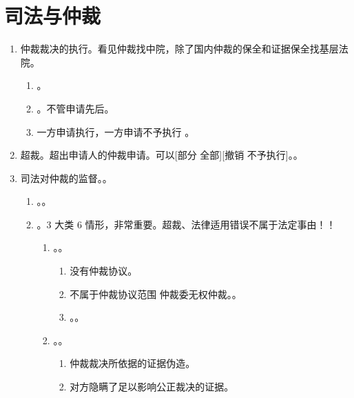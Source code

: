 \section{司法与仲裁}
\begin{enumerate}
  \item 仲裁裁决的执行。看见仲裁找中院，除了国内仲裁的保全和证据保全找基层法院。
        \begin{enumerate}
          \item {}。
          \item {}。不管申请先后。
          \item 一方申请执行，一方申请不予执行 \yjt {}。
        \end{enumerate}
  \item 超裁。超出申请人的仲裁申请。可以[部分 \hz 全部][撤销 \hz 不予执行]。。
  \item 司法对仲裁的监督。。
        \begin{enumerate}
          \item {}。。
          \item {}。3 大类 6 情形，非常重要。超裁、法律适用错误不属于法定事由！！
                \begin{enumerate}
                  \item {}。。
                        \begin{enumerate}
                          \item 没有仲裁协议。
                          \item 不属于仲裁协议范围 \hz 仲裁委无权仲裁。。
                          \item {}。。
                        \end{enumerate}
                  \item {}。。
                        \begin{enumerate}
                          \item 仲裁裁决所依据的证据伪造。
                          \item 对方隐瞒了足以影响公正裁决的证据。

\end{enumerate}
\end{enumerate}
\end{enumerate}
\end{enumerate}

